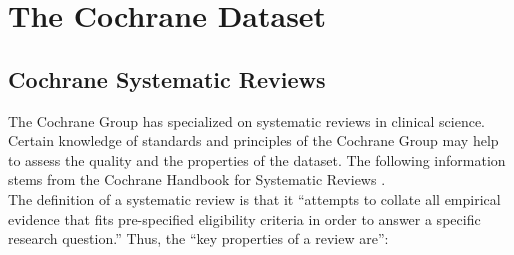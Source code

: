 \documentclass[11pt,a4paper,twoside]{book}\usepackage[]{graphicx}\usepackage[]{color}
\begin{document}
% 
% 
% 
% 
% 
% 













\chapter{The Cochrane Dataset} \label{ch:dataset}


\section{Cochrane Systematic Reviews}
The Cochrane Group has specialized on systematic reviews in clinical science. Certain knowledge of standards and principles of the Cochrane Group may help to assess the quality and the properties of the dataset. The following information stems from the Cochrane Handbook for Systematic Reviews \citep{cochrane.handbook}. \\
The definition of a systematic review is that it ``attempts to collate all empirical evidence that fits pre-specified eligibility criteria in order to answer a specific research question.'' Thus, the ``key properties of a review are'':
\end{document}

